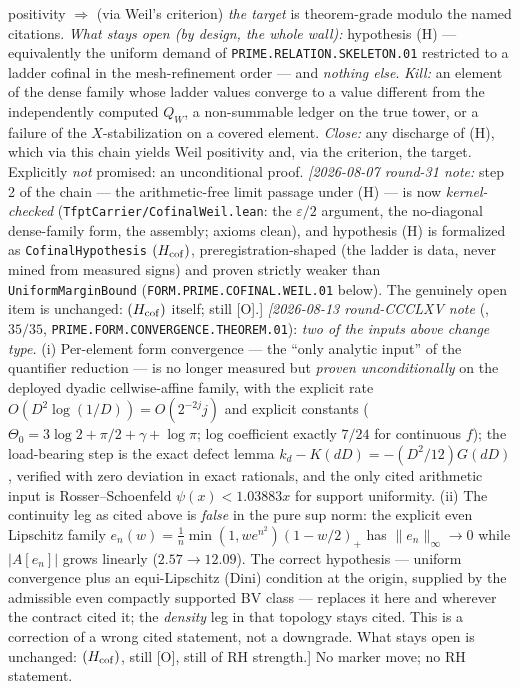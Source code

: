 {{positivity} $\Rightarrow$ (via Weil's criterion) \emph{the
target} is theorem-grade modulo the named citations.  \emph{What
stays open (by design, the whole wall):} hypothesis (H) ---
equivalently the uniform demand of
\texttt{PRIME.RELATION.SKELETON.01} restricted to a ladder
cofinal in the mesh-refinement order --- and \emph{nothing
else}.  \emph{Kill:} an element of
the dense family whose ladder values converge to a value
different from the independently computed $Q_W$, a non-summable
ledger on the true tower, or a failure of the $X$-stabilization
on a covered element.  \emph{Close:} any discharge of (H), which
via this chain yields Weil positivity and, via the criterion,
the target.  Explicitly \emph{not} promised: an unconditional
proof.
\emph{[2026-08-07 round-31 note:} step 2 of the chain --- the
arithmetic-free limit passage under (H) --- is now
\emph{kernel-checked} (\texttt{TfptCarrier/CofinalWeil.lean}:
the $\varepsilon/2$ argument, the no-diagonal dense-family form,
the assembly; axioms clean), and hypothesis (H) is formalized as
\texttt{CofinalHypothesis} $(H_{\rm cof})$,
preregistration-shaped (the ladder is data, never mined from
measured signs) and proven strictly weaker than
\texttt{UniformMarginBound}
(\texttt{FORM.PRIME.COFINAL.WEIL.01} below).  The genuinely open
item is unchanged: $(H_{\rm cof})$ itself; still [O].]
\emph{[2026-08-13 round-CCCLXV note}
(, $35/35$,
\texttt{PRIME.FORM.CONVERGENCE.THEOREM.01}): \emph{two of the
inputs above change type.}  (i) Per-element form convergence ---
the ``only analytic input'' of the quantifier reduction --- is no
longer measured but \emph{proven unconditionally} on the
deployed dyadic cellwise-affine family, with the explicit rate
$O(D^2\log(1/D)) = O(2^{-2j}j)$ and explicit constants
($\Theta_0 = 3\log 2 + \pi/2 + \gamma + \log\pi$; log
coefficient exactly $7/24$ for continuous $f$); the load-bearing
step is the exact defect lemma
$k_d - K(dD) = -(D^2/12)G(dD)$, verified with zero deviation in
exact rationals, and the only cited arithmetic input is
Rosser--Schoenfeld $\psi(x) < 1.03883x$ for support uniformity.
(ii) The continuity leg as cited above is \emph{false} in the
pure sup norm: the explicit even Lipschitz family
$e_n(w) = \tfrac1n\min(1, we^{n^2})(1 - w/2)_+$ has
$\|e_n\|_\infty \to 0$ while $|A[e_n]|$ grows linearly
($2.57 \to 12.09$).  The correct hypothesis --- uniform
convergence plus an equi-Lipschitz (Dini) condition at the
origin, supplied by the admissible even compactly supported BV
class --- replaces it here and wherever the contract cited it;
the \emph{density} leg in that topology stays cited.  This is a
correction of a wrong cited statement, not a downgrade.  What
stays open is unchanged: $(H_{\rm cof})$, still [O], still of RH
strength.]
No marker move; no RH statement.\par}


